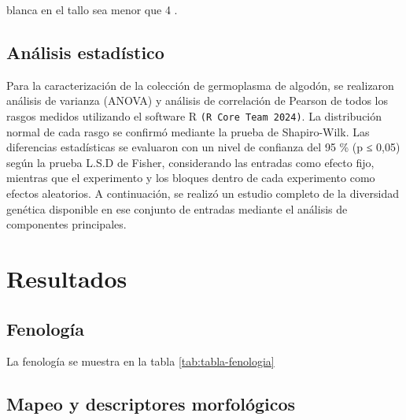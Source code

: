 \documentclass[12pt,oneside]{reedthesis}
\begin{document}
blanca en el tallo sea menor que 4 \autocite{bourland1992}.

\subsection{Análisis estadístico}\label{anuxe1lisis-estaduxedstico}

Para la caracterización de la colección de germoplasma de algodón, se realizaron análisis de varianza (ANOVA) y análisis de correlación de Pearson de todos los rasgos medidos utilizando el software R \texttt{(R\ Core\ Team\ 2024)}. La distribución normal de cada rasgo se confirmó mediante la prueba de Shapiro-Wilk. Las diferencias estadísticas se evaluaron con un nivel de confianza del 95 \% (p ≤ 0,05) según la prueba L.S.D de Fisher, considerando las entradas como efecto fijo, mientras que el experimento y los bloques dentro de cada experimento como efectos aleatorios. A continuación, se realizó un estudio completo de la diversidad genética disponible en ese conjunto de entradas mediante el análisis de componentes principales.

\section{Resultados}\label{resultados}

\subsection{Fenología}\label{fenologuxeda}

La fenología se muestra en la tabla \ref{tab:tabla-fenologia}

\subsection{Mapeo y descriptores morfológicos}\label{mapeo-y-descriptores-morfoluxf3gicos}
\end{document}
